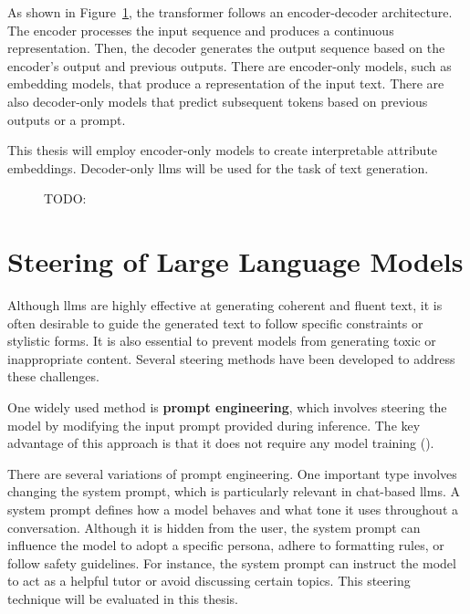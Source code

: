 As shown in Figure~\ref{fig:transformerArchitecture}, the transformer follows an encoder-decoder architecture. The encoder processes the input sequence and produces a continuous representation. Then, the decoder generates the output sequence based on the encoder's output and previous outputs. There are encoder-only models, such as embedding models, that produce a representation of the input text. There are also decoder-only models that predict subsequent tokens based on previous outputs or a prompt.

This thesis will employ encoder-only models to create interpretable attribute embeddings. Decoder-only \acp{llm} will be used for the task of text generation.

\begin{figure}[ht]
  \begin{center}
    
  \end{center}
  \caption{TODO:} %
  \label{fig:transformerArchitecture}
\end{figure}

\section{Steering of Large Language Models}
\label{sec:background:llm:steering}

Although \acp{llm} are highly effective at generating coherent and fluent text, it is often desirable to guide the generated text to follow specific constraints or stylistic forms. It is also essential to prevent models from generating toxic or inappropriate content. Several steering methods have been developed to address these challenges.

One widely used method is \textbf{prompt engineering}, which involves steering the model by modifying the input prompt provided during inference. The key advantage of this approach is that it does not require any model training (\cite{schulhoffPromptReportSystematic2024}).

There are several variations of prompt engineering. One important type involves changing the system prompt, which is particularly relevant in chat-based \acp{llm}. A system prompt defines how a model behaves and what tone it uses throughout a conversation. Although it is hidden from the user, the system prompt can influence the model to adopt a specific persona, adhere to formatting rules, or follow safety guidelines. For instance, the system prompt can instruct the model to act as a helpful tutor or avoid discussing certain topics. This steering technique will be evaluated in this thesis.

